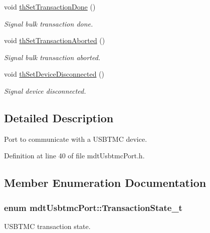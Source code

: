 \begin{DoxyCompactItemize}
void \hyperlink{classmdt_usbtmc_port_ab72af815af2f766e4062e2db43998f7c}{th\-Set\-Transaction\-Done} ()
\begin{DoxyCompactList}\small\item\em Signal bulk transaction done. \end{DoxyCompactList}\item 
void \hyperlink{classmdt_usbtmc_port_a1f864b8480f5953c0166478dd0f0c2c2}{th\-Set\-Transaction\-Aborted} ()
\begin{DoxyCompactList}\small\item\em Signal bulk transaction aborted. \end{DoxyCompactList}\item 
void \hyperlink{classmdt_usbtmc_port_a476cae8e5b124980ea2925e98fa70c68}{th\-Set\-Device\-Disconnected} ()
\begin{DoxyCompactList}\small\item\em Signal device disconnected. \end{DoxyCompactList}\end{DoxyCompactItemize}


\subsection{Detailed Description}
Port to communicate with a U\-S\-B\-T\-M\-C device. 

Definition at line 40 of file mdt\-Usbtmc\-Port.\-h.



\subsection{Member Enumeration Documentation}
\hypertarget{classmdt_usbtmc_port_a95543679f3981f4a061bb46731731868}{
\subsubsection[{Transaction\-State\-\_\-t}]{\setlength{\rightskip}{0pt plus 5cm}enum {\bf mdt\-Usbtmc\-Port\-::\-Transaction\-State\-\_\-t}\hspace{0.3cm}{\ttfamily [strong]}}}\label{classmdt_usbtmc_port_a95543679f3981f4a061bb46731731868}


U\-S\-B\-T\-M\-C transaction state. 

